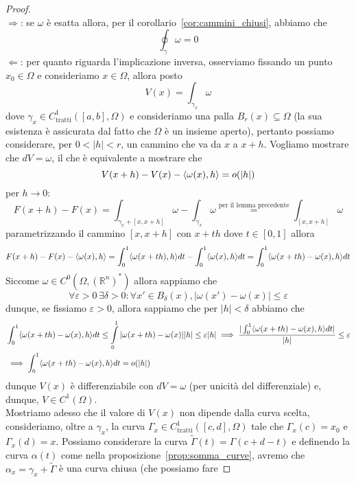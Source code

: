 \begin{proof} \hspace{1cm} \\
$\boxed{\Rightarrow}$: se $\omega$ è esatta allora, per il corollario~\ref{cor:cammini_chiusi}, abbiamo che
$$
\oint_\gamma \omega = 0
$$
$\boxed{\Leftarrow}$: per quanto riguarda l'implicazione inversa, osserviamo fissando un punto $x_0 \in \Omega$ e consideriamo $x \in \Omega$, allora posto
$$
V(x) = \int_{\gamma_x} \omega
$$
dove $\gamma_x \in C^1_\text{tratti}([a, b], \Omega)$ e consideriamo una palla $B_r(x) \subseteq \Omega$ (la sua esistenza è assicurata dal fatto che $\Omega$ è un insieme aperto), pertanto possiamo considerare, per $0 < |h| < r$, un cammino che va da $x$ a $x+h$. Vogliamo mostrare che $dV =\omega$, il che è equivalente a mostrare che $$V(x+h) - V(x) - \langle \omega(x), h \rangle = o(|h|)$$ per $h \to 0$:
$$
F(x+h) - F(x) = \int_{\gamma_x + [x, x+h]} \omega - \int_{\gamma_x} \omega \stackrel{\text{per il lemma precedente}}{=} \int_{[x, x+h]} \omega
$$
parametrizzando il cammino $[x, x+h]$ con $x + th$ dove $t \in [0,1]$ allora
$$
F(x+h)-F(x) - \langle \omega(x), h \rangle = \int_0^1 \langle \omega(x + th), h \rangle dt - \int_0^1 \langle \omega(x), h \rangle dt = \int_0^1 \langle \omega(x + th) - \omega(x), h \rangle dt
$$
Siccome $\omega \in C^0(\Omega, (\mathbb{R}^n)^*)$ allora sappiamo che
$$
\forall \varepsilon > 0 \, \exists \delta > 0: \forall x' \in B_\delta(x), |\omega(x') - \omega(x)| \leq \varepsilon
$$
dunque, se fissiamo $\varepsilon > 0$, allora sappiamo che per $|h| < \delta$ abbiamo che
\begin{align*}
&\int_0^1 \langle \omega(x + th) - \omega(x), h \rangle dt \leq \int\limits_0^1 |\omega(x + th) - \omega(x)||h| \leq \varepsilon |h| \implies \frac{|\int_0^1 \langle \omega(x + th) - \omega(x), h \rangle dt|}{|h|} \leq \varepsilon \\
&\implies \int_0^1 \langle \omega(x + th) - \omega(x), h \rangle dt = o(|h|) 
\end{align*}
dunque $V(x)$ è differenziabile con $dV = \omega$ (per unicità del differenziale) e, dunque, $V \in C^1(\Omega)$. \\
Mostriamo adesso che il valore di $V(x)$ non dipende dalla curva scelta, consideriamo, oltre a $\gamma_x$, la curva $\Gamma_x \in C^1_\text{tratti}([c, d], \Omega)$ tale che $\Gamma_x(c) = x_0$ e $\Gamma_x(d) = x$. Possiamo considerare la curva $\tilde{\Gamma}(t) = \Gamma(c + d - t)$ e definendo la curva $\alpha(t)$ come nella proposizione~\ref{prop:somma_curve}, avremo che $\alpha_x = \gamma_x + \tilde{\Gamma}$ è una curva chiusa (che possiamo fare

\end{proof}
